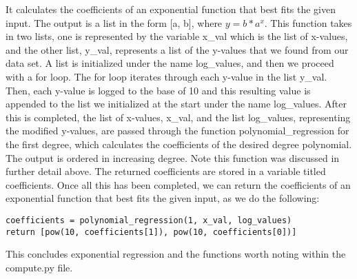 \documentclass[fontsize=11pt]{article}
\begin{document}
It calculates the coefficients of an exponential function that best fits the given input. The output is a list in the form [a, b], where $y = b * a^x$. This function takes in two lists, one is represented by the variable x\_val which is the list of x-values, and the other list, y\_val, represents a list of the y-values that we found from our data set. A list is initialized under the name log\_values, and then we proceed with a for loop. The for loop iterates through each y-value in the list y\_val. Then, each y-value is logged to the base of 10 and this resulting value is appended to the list we initialized at the start under the name log\_values. After this is completed, the list of x-values, x\_val, and the list log\_values, representing the modified y-values, are passed through the function polynomial\_regression for the first degree, which calculates the coefficients of the desired degree polynomial. The output is ordered in increasing degree. Note this function was discussed in further detail above. The returned coefficients are stored in a variable titled coefficients. Once all this has been completed, we can return the coefficients of an exponential function that best fits the given input, as we do the following:

\begin{verbatim}
coefficients = polynomial_regression(1, x_val, log_values)
return [pow(10, coefficients[1]), pow(10, coefficients[0])]
\end{verbatim}

This concludes exponential regression and the functions worth noting within the compute.py file. 
\end{document}
